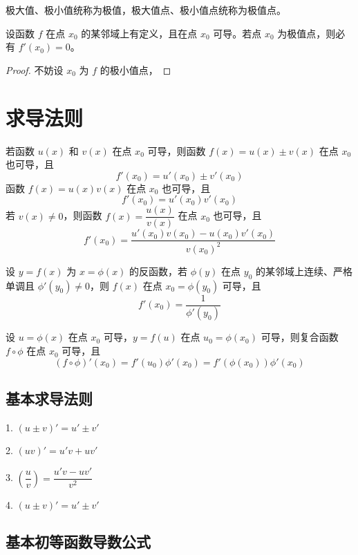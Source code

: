 极大值、极小值统称为极值，极大值点、极小值点统称为极值点。

\begin{theorem}[费马定理]
	设函数 $f$ 在点 $x_0$ 的某邻域上有定义，且在点 $x_0$ 可导。若点 $x_0$ 为极值点，则必有 $f'(x_0)=0$。
\end{theorem}

\begin{proof}
    不妨设 $x_0$ 为 $f$ 的极小值点，
\end{proof}

\section{求导法则}

\begin{theorem}
	若函数 $u(x)$ 和 $v(x)$ 在点 $x_0$ 可导，则函数 $f(x)=u(x)\pm v(x)$ 在点 $x_0$ 也可导，且
	$$f'(x_0) = u'(x_0)\pm v'(x_0)$$
	函数 $f(x)=u(x)v(x)$ 在点 $x_0$ 也可导，且
	$$f'(x_0) = u'(x_0)v'(x_0)$$
	若 $v(x)\ne 0$，则函数 $f(x)=\dfrac{u(x)}{v(x)}$ 在点 $x_0$ 也可导，且
	$$f'(x_0) = \frac{u'(x_0)v(x_0)-u(x_0)v'(x_0)}{v(x_0)^2}$$
\end{theorem}

\begin{theorem}
	设 $y=f(x)$ 为 $x=\phi(x)$ 的反函数，若 $\phi(y)$ 在点 $y_0$ 的某邻域上连续、严格单调且 $\phi'(y_0)\ne0$，则 $f(x)$ 在点 $x_0=\phi(y_0)$ 可导，且
	$$f'(x_0)=\frac{1}{\phi'(y_0)}$$
\end{theorem}

\begin{theorem}
	设 $u=\phi(x)$ 在点 $x_0$ 可导，$y=f(u)$ 在点 $u_0=\phi(x_0)$ 可导，则复合函数 $f\circ \phi$ 在点 $x_0$ 可导，且
	$$(f\circ \phi)'(x_0) = f'(u_0)\phi'(x_0) = f'(\phi(x_0))\phi'(x_0)$$
\end{theorem}

\subsection{基本求导法则}

1. $(u\pm v)' = u'\pm v'$

2. $(uv)' = u'v+uv'$

3. $\left(\dfrac{u}{v}\right) = \dfrac{u'v-uv'}{v^2}$

4. $(u\pm v)' = u'\pm v'$

\subsection{基本初等函数导数公式}

